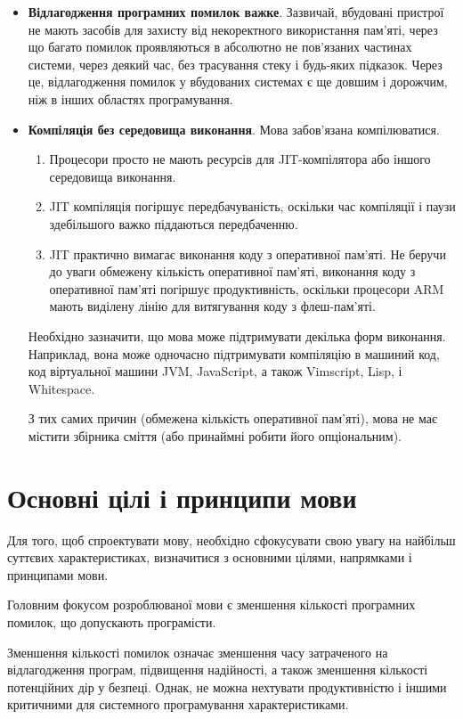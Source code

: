 \documentclass[main.tex]{subfiles}
\begin{document}
\begin{itemize}[nosep]
\item \textbf{Відлагодження програмних помилок важке}. Зазвичай, вбудовані пристрої не мають засобів для захисту від некоректного використання пам'яті, через що багато помилок проявляються в абсолютно не пов'язаних частинах системи, через деякий час, без трасування стеку і будь-яких підказок. Через це, відлагодження помилок у вбудованих системах є ще довшим і дорожчим, ніж в інших областях програмування.

\item \textbf{Компіляція без середовища виконання}. Мова забов'язана компілюватися.

\begin{enumerate}[nosep]
\item Процесори просто не мають ресурсів для JIT-компілятора або іншого середовища виконання.
\item JIT компіляція погіршує передбачуваність, оскільки час компіляції і паузи здебільшого важко піддаються передбаченню.
\item JIT практично вимагає виконання коду з оперативної пам'яті. Не беручи до уваги обмежену кількість оперативної пам'яті, виконання коду з оперативної пам'яті погіршує продуктивність, оскільки процесори ARM мають виділену лінію для витягування коду з флеш-пам'яті.
\end{enumerate}

Необхідно зазначити, що мова може підтримувати декілька форм виконання. Наприклад, вона може одночасно підтримувати компіляцію в машиний код, код віртуальної машини JVM, JavaScript, а також Vimscript, Lisp, і Whitespace.

З тих самих причин (обмежена кількість оперативної пам'яті), мова не має містити збірника сміття (або принаймні робити його опціональним).
\end{itemize}

\section{Основні цілі і принципи мови}
Для того, щоб спроектувати мову, необхідно сфокусувати свою увагу на найбільш суттєвих характеристиках, визначитися з основними цілями, напрямками і принципами мови.

Головним фокусом розроблюваної мови є зменшення кількості програмних помилок, що допускають програмісти.

Зменшення кількості помилок означає зменшення часу затраченого на відлагодження програм, підвищення надійності, а також зменшення кількості потенційних дір у безпеці.
Однак, не можна нехтувати продуктивністю і іншими критичними для системного програмування характеристиками.
\end{document}

